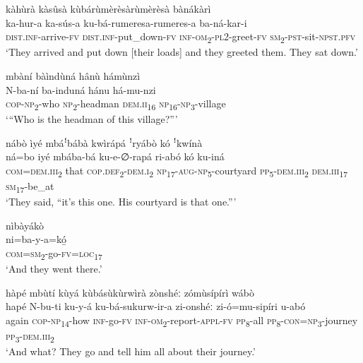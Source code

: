 kàhùrà kàsûsà kùbárùmèrèsàrùmèrèsà bànákàrì\\
\gll ka-hur-a    ka-sús-a      ku-bá-rumeresa-rumeres-a ba-ná-kar-i \\
\textsc{dist}.\textsc{inf}{}-arrive-\textsc{fv}  \textsc{dist}.\textsc{inf}{}-put\_down-\textsc{fv}  \textsc{inf}{}-\textsc{om}\textsubscript{2}{}-\textsc{pl}2-greet-\textsc{fv}
\textsc{sm}\textsubscript{2}{}-\textsc{pst}{}-sit-\textsc{npst}.\textsc{pfv}\\
\glt ‘They arrived and put down [their loads] and they greeted them. They sat down.’\bigskip

mbàní bàìndùná hânù hámùnzì \\
\gll N-ba-ní    ba-induná    hánu    há-mu-nzi\\
\textsc{cop}{}-\textsc{np}\textsubscript{2}{}-who  \textsc{np}\textsubscript{2}{}-headman    \textsc{dem}.\textsc{ii}\textsubscript{16}  \textsc{np}\textsubscript{16}{}-\textsc{np}\textsubscript{3}{}-village\\
\glt ‘“Who is the headman of this village?”’\bigskip

nábò ìyé mbáꜝbábà kwìrápá ꜝryábò kó ꜝkwínà\\
\gll ná=bo    iyé  mbába-bá  ku-e-∅-rapá      ri-abó    kó    ku-iná \\
\textsc{com}=\textsc{dem}.\textsc{iii}\textsubscript{2}  that  \textsc{cop}.\textsc{def}\textsubscript{2}{}-\textsc{dem}.\textsc{i}\textsubscript{2}
\textsc{np}\textsubscript{17}{}-\textsc{aug}{}-\textsc{np}\textsubscript{5}{}-courtyard  \textsc{pp}\textsubscript{5}{}-\textsc{dem}.\textsc{iii}\textsubscript{2} \textsc{dem}.\textsc{iii}\textsubscript{17}  \textsc{sm}\textsubscript{17}{}-be\_at\\
\glt ‘They said, “it’s this one. His courtyard is that one.”’\bigskip

nìbàyákò\\
\gll ni=ba-y-a=kó̲\\
\textsc{com}=\textsc{sm}\textsubscript{2}{}-go-\textsc{fv}=\textsc{loc}\textsubscript{17}\\
\glt ‘And they went there.’\bigskip

hàpé mbùtí kùyá kùbásùkùrwìrà zònshéː zómùsípírì wábò\\
\gll hapé  N-bu-ti    ku-y-á  ku-bá-sukurw-ir-a zi-onshéː  zi-ó=mu-sipíri     u-abó\\
again  \textsc{cop}{}-\textsc{np}\textsubscript{14}{}-how  \textsc{inf}{}-go-\textsc{fv}  \textsc{inf}{}-\textsc{om}\textsubscript{2}{}-report-\textsc{appl}{}-\textsc{fv}
\textsc{pp}\textsubscript{8}{}-all    \textsc{pp}\textsubscript{8}{}-\textsc{con}=\textsc{np}\textsubscript{3}{}-journey  \textsc{pp}\textsubscript{3}{}-\textsc{dem}.\textsc{iii}\textsubscript{2}\\
\glt ‘And what? They go and tell him all about their journey.’\bigskip

